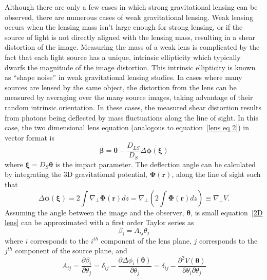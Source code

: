 Although there are only a few cases in which strong gravitational lensing can be observed, there are numerous cases of weak gravitational lensing.  Weak lensing occurs when the lensing mass isn't large enough for strong lensing, or if the source of light is not directly aligned with the lensing mass, resulting in a shear distortion of the image.  Measuring the mass of a weak lens is complicated by the fact that each light source has a unique, intrinsic ellipticity which typically dwarfs the magnitude of the image distortion.  This intrinsic ellipticity is known as ``shape noise'' in weak gravitational lensing studies.  In cases where many sources are lensed by the same object, the distortion from the lens can be measured by averaging over the many source images, taking advantage of their random intrinsic orientation.  In these cases, the measured shear distortion results from photons being deflected by mass fluctuations along the line of sight.  In this case, the two dimensional lens equation (analogous to equation~\ref{lens eq 2}) in vector format is
\begin{equation} \label{2D lens}
\boldsymbol{\beta} = \boldsymbol{\theta} - \frac{D_{LS}}{D_S} \Delta \boldsymbol{\phi}(\boldsymbol{\xi})
\end{equation}
where $\boldsymbol{\xi}=D_{S}\boldsymbol{\theta}$ is the impact parameter.  The deflection angle can be calculated by integrating the 3D gravitational potential, $\boldsymbol{\Phi}(\mathbf{r})$, along the line of sight such that
\begin{equation} \label{3D angle}
\Delta \boldsymbol{\phi}(\boldsymbol{\xi}) = 2 \int \nabla_\perp \boldsymbol{\Phi}(\mathbf{r})dz = \nabla_\perp \left(2\int \boldsymbol{\Phi}(\mathbf{r}) dz \right) \equiv \nabla_\perp V.
\end{equation}
Assuming the angle between the image and the observer, $\boldsymbol{\theta}$, is small equation~\ref{2D lens} can be approximated with a first order Taylor series as
\begin{equation} \label{lens taylor}
\beta_{i}=A_{ij} \theta_{j}
\end{equation}
where $i$ corresponds to the $i^{th}$ component of the lens plane, $j$ corresponds to the $j^{th}$ component of the source plane, and 
\begin{equation} \label{dist matrix elements}
A_{ij}=\frac{ \partial \beta_i}{\partial \theta_j} = \delta_{ij} - \frac{ \partial \Delta \phi_i( \boldsymbol{\theta}) }{\partial \theta_j} = \delta_{ij} - 
\frac{ \partial ^2 V(\boldsymbol{\theta})} {\partial \theta_i \partial \theta_j}
\end{equation}
